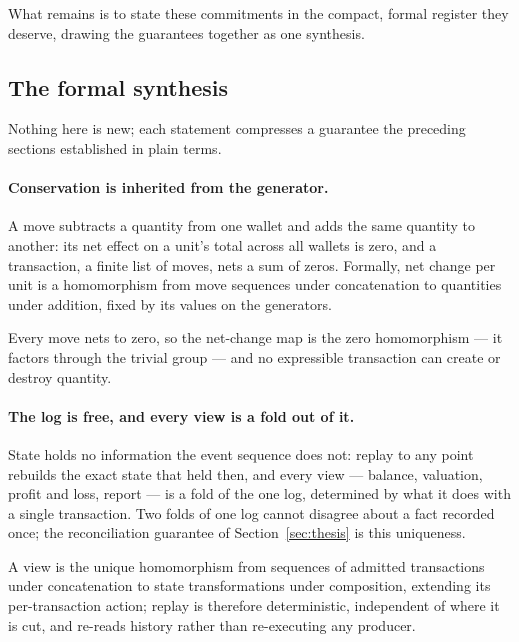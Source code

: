 What remains is to state these commitments in the compact, formal register they
deserve, drawing the guarantees together as one synthesis.

\subsection{The formal synthesis}

Nothing here is new; each statement compresses a guarantee the preceding
sections established in plain terms.

\paragraph{Conservation is inherited from the generator.} A move subtracts a
quantity from one wallet and adds the same quantity to another: its net effect
on a unit's total across all wallets is zero, and a transaction, a finite list
of moves, nets a sum of zeros. Formally, net change per unit is a homomorphism
from move sequences under concatenation to quantities under addition, fixed by
its values on the generators.

\begin{proposition}\label{prop:syn-conservation}
Every move nets to zero, so the net-change map is the zero homomorphism --- it
factors through the trivial group --- and no expressible transaction can create
or destroy quantity.
\end{proposition}

\paragraph{The log is free, and every view is a fold out of it.} State holds no
information the event sequence does not: replay to any point rebuilds the exact
state that held then, and every view --- balance, valuation, profit and loss,
report --- is a fold of the one log, determined by what it does with a single
transaction. Two folds of one log cannot disagree about a fact recorded once;
the reconciliation guarantee of Section~\ref{sec:thesis} is this uniqueness.

\begin{proposition}\label{prop:syn-fold}
A view is the unique homomorphism from sequences of admitted transactions under
concatenation to state transformations under composition, extending its
per-transaction action; replay is therefore deterministic, independent of
where it is cut, and re-reads history rather than re-executing any producer.
\end{proposition}

